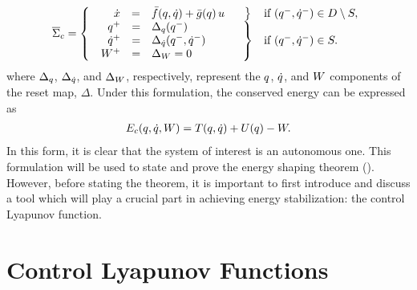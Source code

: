 \begin{align}
  \HCSbar = \left\{
    \begin{array}{l c l}
      \begin{array}{r c l}
        \hspace{1.15em}\dx &=& \xfbar\argsqdq + \xgbar\argsq \, \uu
      \end{array} &
      \left.\vphantom{\begin{array}{r c l}
            \hspace{1.15em}\dx &=& \xfbar\argsqdq + \xgbar\argsq \, \uu
          \end{array}}\right\} & \mbox{if } \argsqmdqm \in \D \setminus \Guard,\\
      \begin{array}{r c l}
        \qp &=& \Deltaq\argsqm\\
        \dqp &=& \Deltadq\argsqmdqm\\
        \Wp &=& \DeltaW = 0
      \end{array} &
      \left.\vphantom{\begin{array}{r c l}
            \qp &=& \Deltaq\argsqm\\
            \dqp &=& \Deltadq\argsqmdqm\\
            \Wp &=& \DeltaW = 0
          \end{array}}\right\} & \mbox{if } \argsqmdqm \in \Guard.
    \end{array}\right.
  \label{eq:hcs_bar}
\end{align}
where $\Delta_{q}$, $\Delta_{\dot{q}}$, and $\Delta_{W}$, respectively, represent the $q$,
$\dot{q}$, and $W$ components of the reset map, $\Delta$.
% 
Under this formulation, the conserved energy can be expressed as
\begin{align*}
  E_{c}(q, \dot{q}, W) = T(q, \dot{q}) + U(q) - W.
\end{align*}
% 
In this form, it is clear that the system of interest is an autonomous one.
% 
This formulation will be used to state and prove the energy shaping theorem (). 
% 
However, before stating the theorem, it is important to first introduce and
discuss a tool which will play a crucial part in achieving energy stabilization:
the control Lyapunov function.

\section{Control Lyapunov Functions}

